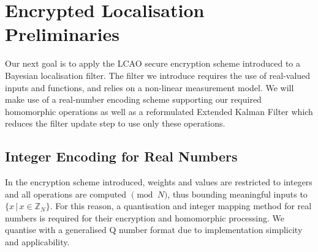 \documentclass[10pt,journal,compsoc]{IEEEtran}
\theoremstyle{definition}
\theoremstyle{definition}
\theoremstyle{remark}
\begin{document}
% 
%                                                                                                     
%                                                                                                     
%                                                                                                     
% 

\section{Encrypted Localisation Preliminaries} \label{sec:loc_prelim}
Our next goal is to apply the LCAO secure encryption scheme introduced to a Bayesian localisation filter. The filter we introduce requires the use of real-valued inputs and functions, and relies on a non-linear measurement model. We will make use of a real-number encoding scheme supporting our required homomorphic operations as well as a reformulated Extended Kalman Filter which reduces the filter update step to use only these operations.

% 
% 

\subsection{Integer Encoding for Real Numbers} \label{subsec:encoding}
In the encryption scheme introduced, weights and values are restricted to integers and all operations are computed $\pmod{N}$, thus bounding meaningful inputs to $\{x \,|\, x \in \mathbb{Z}_N\}$. For this reason, a quantisation and integer mapping method for real numbers is required for their encryption and homomorphic processing. We quantise with a generalised Q number format \cite{oberstarFixedPointRepresentationFractional2007} due to implementation simplicity and applicability.
\end{document}

